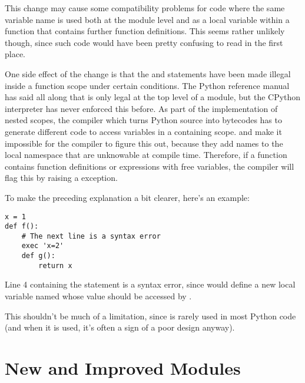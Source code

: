 \documentclass{howto}
\begin{document}
This change may cause some compatibility problems for code where the
same variable name is used both at the module level and as a local
variable within a function that contains further function definitions.
This seems rather unlikely though, since such code would have been
pretty confusing to read in the first place.  

One side effect of the change is that the  and  statements have been made illegal inside
a function scope under certain conditions.  The Python reference
manual has said all along that  is
only legal at the top level of a module, but the CPython interpreter
has never enforced this before.  As part of the implementation of
nested scopes, the compiler which turns Python source into bytecodes
has to generate different code to access variables in a containing
scope.   and  make it
impossible for the compiler to figure this out, because they add names
to the local namespace that are unknowable at compile time.
Therefore, if a function contains function definitions or
 expressions with free variables, the compiler will
flag this by raising a  exception.

To make the preceding explanation a bit clearer, here's an example:

\begin{verbatim}
x = 1
def f():
    # The next line is a syntax error
    exec 'x=2'  
    def g():
        return x
\end{verbatim}

Line 4 containing the  statement is a syntax error,
since  would define a new local variable named 
whose value should be accessed by .  

This shouldn't be much of a limitation, since  is rarely
used in most Python code (and when it is used, it's often a sign of a
poor design anyway).

\begin{seealso}


\end{seealso}


\section{New and Improved Modules}
\end{document}

